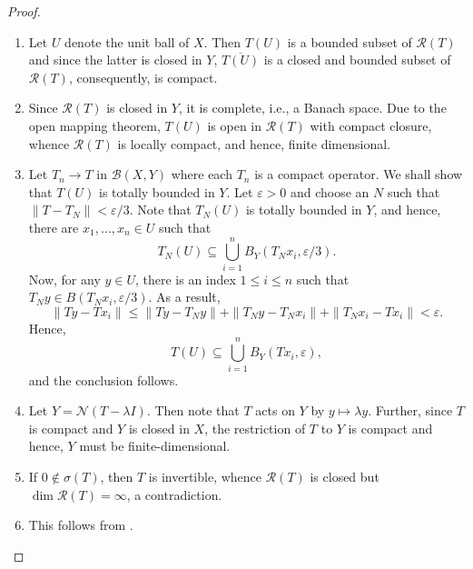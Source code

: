 \documentclass[11pt]{article}
\theoremstyle{thmstyle}
\theoremstyle{defstyle}
\newcommand{\scrB}{\mathscr B}
\newcommand{\scrN}{\mathscr N}
\newcommand{\scrR}{\mathscr R}
\renewcommand{\le}{\leqslant}
\begin{document}
\begin{proof}
\begin{enumerate}[label=(\alph*)]
    \item Let $U$ denote the unit ball of $X$. Then $T(U)$ is a bounded subset of $\scrR(T)$ and since the latter is closed in $Y$, $\overline{T(U)}$ is a closed and bounded subset of $\scrR(T)$, consequently, is compact.
    \item Since $\scrR(T)$ is closed in $Y$, it is complete, i.e., a Banach space. Due to the open mapping theorem, $T(U)$ is open in $\scrR(T)$ with compact closure, whence $\scrR(T)$ is locally compact, and hence, finite dimensional.
    \item Let $T_n\to T$ in $\scrB(X, Y)$ where each $T_n$ is a compact operator. We shall show that $T(U)$ is totally bounded in $Y$. Let $\varepsilon > 0$ and choose an $N$ such that $\|T - T_N\| < \varepsilon/3$. Note that $T_N(U)$ is totally bounded in $Y$, and hence, there are $x_1,\dots,x_n\in U$ such that 
    \begin{equation*}
        T_N(U)\subseteq\bigcup_{i = 1}^n B_Y(T_Nx_i, \varepsilon/3).
    \end{equation*}
    Now, for any $y\in U$, there is an index $1\le i\le n$ such that $T_Ny\in B(T_Nx_i, \varepsilon/3)$. As a result, 
    \begin{equation*}
        \|Ty - Tx_i\|\le\|Ty - T_Ny\| + \|T_Ny - T_Nx_i\| + \|T_Nx_i - Tx_i\| < \varepsilon.
    \end{equation*}
    Hence, 
    \begin{equation*}
        T(U)\subseteq\bigcup_{i = 1}^n B_Y(Tx_i, \varepsilon),
    \end{equation*}
    and the conclusion follows.

    \item Let $Y = \scrN(T - \lambda I)$. Then note that $T$ acts on $Y$ by $y\mapsto\lambda y$. Further, since $T$ is compact and $Y$ is closed in $X$, the restriction of $T$ to $Y$ is compact and hence, $Y$ must be finite-dimensional. 
    \item If $0\notin\sigma(T)$, then $T$ is invertible, whence $\scrR(T)$ is closed but $\dim\scrR(T) = \infty$, a contradiction. 
    \item This follows from .\qedhere
\end{enumerate}
\end{proof}
\end{document}
